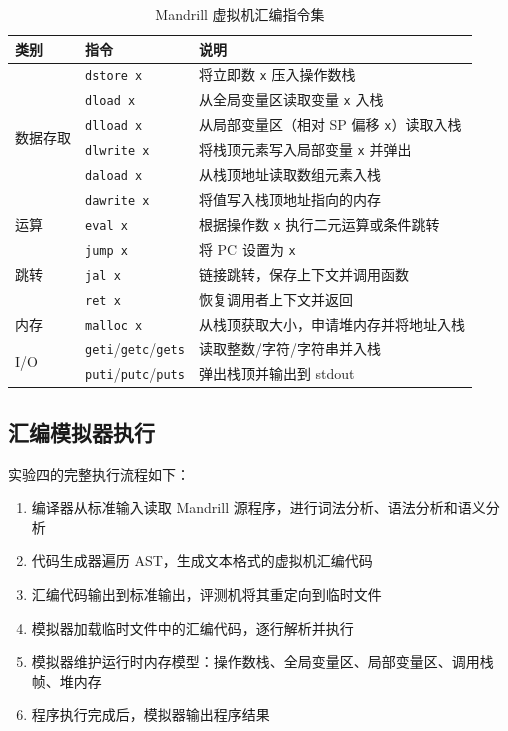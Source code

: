 \documentclass[12pt,hyperref,a4paper,UTF8]{ctexart}
\begin{document}
\begin{table}[!htbp]
    \centering
    \caption{Mandrill 虚拟机汇编指令集}
    \label{tab:instructions}
    \begin{tabular}{l|l|l}
    \hline
    类别 & 指令 & 说明 \\ \hline
    \multirow{6}{*}{数据存取}
     & \texttt{dstore x} & 将立即数 \texttt{x} 压入操作数栈 \\
     & \texttt{dload x} & 从全局变量区读取变量 \texttt{x} 入栈 \\
     & \texttt{dlload x} & 从局部变量区（相对 SP 偏移 \texttt{x}）读取入栈 \\
     & \texttt{dlwrite x} & 将栈顶元素写入局部变量 \texttt{x} 并弹出 \\
     & \texttt{daload x} & 从栈顶地址读取数组元素入栈 \\
     & \texttt{dawrite x} & 将值写入栈顶地址指向的内存 \\ \hline
    \multirow{1}{*}{运算}
     & \texttt{eval x} & 根据操作数 \texttt{x} 执行二元运算或条件跳转 \\ \hline
    \multirow{3}{*}{跳转}
     & \texttt{jump x} & 将 PC 设置为 \texttt{x} \\
     & \texttt{jal x} & 链接跳转，保存上下文并调用函数 \\
     & \texttt{ret x} & 恢复调用者上下文并返回 \\ \hline
    \multirow{1}{*}{内存}
     & \texttt{malloc x} & 从栈顶获取大小，申请堆内存并将地址入栈 \\ \hline
    \multirow{2}{*}{I/O}
     & \texttt{geti}/\texttt{getc}/\texttt{gets} & 读取整数/字符/字符串并入栈 \\
     & \texttt{puti}/\texttt{putc}/\texttt{puts} & 弹出栈顶并输出到 stdout \\ \hline
    \end{tabular}
\end{table}

\subsection{汇编模拟器执行}

实验四的完整执行流程如下：

\begin{enumerate}
    \item 编译器从标准输入读取 Mandrill 源程序，进行词法分析、语法分析和语义分析
    \item 代码生成器遍历 AST，生成文本格式的虚拟机汇编代码
    \item 汇编代码输出到标准输出，评测机将其重定向到临时文件
    \item 模拟器加载临时文件中的汇编代码，逐行解析并执行
    \item 模拟器维护运行时内存模型：操作数栈、全局变量区、局部变量区、调用栈帧、堆内存
    \item 程序执行完成后，模拟器输出程序结果
\end{enumerate}
\end{document}
